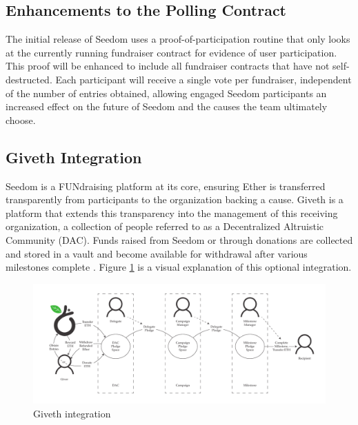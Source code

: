 \documentclass[11pt]{article}
\begin{document}
\subsection{Enhancements to the Polling Contract}
\label{sec:enhancementsToThePollingContract}

The initial release of Seedom uses a proof-of-participation routine that only looks at the currently running fundraiser contract for evidence of user participation. This proof will be enhanced to include all fundraiser contracts that have not self-destructed. Each participant will receive a single vote per fundraiser, independent of the number of entries obtained, allowing engaged Seedom participants an increased effect on the future of Seedom and the causes the team ultimately choose.

\subsection{Giveth Integration}

Seedom is a FUNdraising platform at its core, ensuring Ether is transferred transparently from participants to the organization backing a cause. Giveth is a platform that extends this transparency into the management of this receiving organization, a collection of people referred to as a Decentralized Altruistic Community (DAC). Funds raised from Seedom or through donations are collected and stored in a vault and become available for withdrawal after various milestones complete \cite{11}. Figure \ref{figure:givethIntegration} is a visual explanation of this optional integration.

\begin{figure}[H]
\begin{center}
\includegraphics[width=1.0\textwidth]{./graphics/giveth-integration.pdf}
\caption{Giveth integration \cite{11}}
\label{figure:givethIntegration}
\end{center}
\end{figure}
\end{document}
